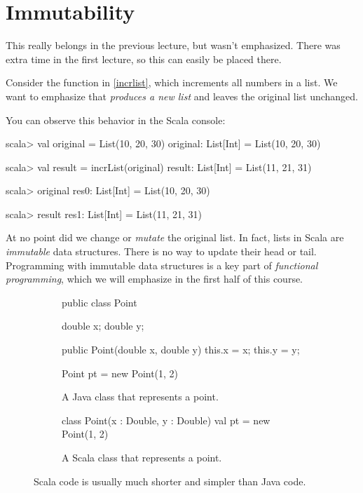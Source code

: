 \documentclass{book}
\begin{document}
\section{Immutability }

\begin{instructor}
This really belongs in the previous lecture, but wasn't emphasized.
There was extra time in the first lecture, so this can easily be
placed there.
\end{instructor}

Consider the function  in \cref{incrlist}, which
increments all numbers in a list. We want to emphasize that 
\emph{produces a new list} and leaves the original list unchanged.

You can observe this behavior in the Scala console:
%
\begin{console}
scala> val original = List(10, 20, 30)
original: List[Int] = List(10, 20, 30)

scala> val result = incrList(original)
result: List[Int] = List(11, 21, 31)

scala> original
res0: List[Int] = List(10, 20, 30)

scala> result
res1: List[Int] = List(11, 21, 31)
\end{console}

At no point did we change or \emph{mutate} the original list. In fact, lists in
Scala are \emph{immutable} data structures. There is no way to update their
head or tail. Programming with immutable data structures is a key part of
\emph{functional programming}, which we will emphasize in the first half
of this course.

\begin{figure}
\begin{subfigure}[b]{.45\textwidth}
\begin{javacode}
public class Point {

  double x;
  double y;

  public Point(double x, double y) {
    this.x = x;
    this.y = y;
  }

}

Point pt = new Point(1, 2)
\end{javacode}
\caption{A Java class that represents a point.}\label{javapoint}
\end{subfigure}
\quad\vrule\quad
%
\begin{subfigure}[b]{.45\textwidth}
\begin{scalacode}
class Point(x : Double, y : Double)
val pt = new Point(1, 2)
\end{scalacode}
\caption{A Scala class that represents a point.}\label{scalapoint}
\end{subfigure}
\caption{Scala code is usually much shorter and simpler than Java code.}
\end{figure}
\end{document}
